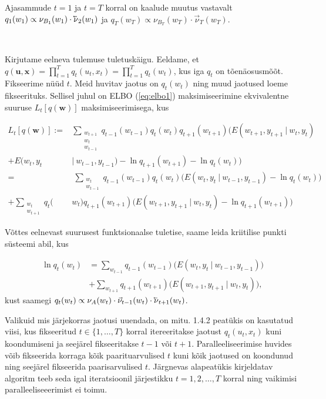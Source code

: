 Ajasammude $t=1$ ja $t=T$ korral on kaalude muutus vastavalt $q_1(w_1) \propto \nu_{B_1}(w_1) \cdot \cev{\nu}_{2}(w_1)$ ja $q_T(w_T) \propto \nu_{B_T}(w_T) \cdot \vec{\nu}_{T}(w_T)$.

\

Kirjutame eelneva tulemuse tuletuskäigu. Eeldame, et $q(\bm{u}, \bm{x}) = \prod_{t=1}^T{q_t(u_t, x_t)} = \prod_{t=1}^T{q_t(w_t)}$, kus iga $q_t$ on tõenäosusmõõt. Fikseerime nüüd $t$. Meid huvitav jaotus on $q_t(w_t)$ ning muud jaotused loeme fikseerituks. Sellisel juhul on ELBO (\ref{eq:elbo1}) maksimiseerimine ekvivalentne suuruse $L_t[q(\bm{w})]$ maksimiseerimisega, kus


\begin{align*}
    L_t[q(\bm{w})] :=& \sum_{\substack{w_{t+1}\\ w_{t} \\ w_{t-1}}} q_{t-1}(w_{t-1}) q_t(w_{t}) q_{t+1}(w_{t+1}) \Big(E(w_{t+1}, y_{t+1}\ |\ w_{t}, y_{t}) \\
    + E(w_{t}, y_{t}\ &|\ w_{t-1}, y_{t-1}) -  \ln q_{t+1}(w_{t+1}) -  \ln q_t(w_{t})  \Big)\\
    =&\ \sum_{\substack{w_t\\ w_{t-1}} } q_{t-1}(w_{t-1})q_t(w_{t}) \Big(E(w_{t}, y_{t}\ |\ w_{t-1}, y_{t-1}) -  \ln q_t(w_{t})  \Big)\\
    + \sum_{\substack{w_{t}\\ w_{t+1} }} q_t(&w_t)q_{t+1}(w_{t+1}) \Big(E(w_{t+1}, y_{t+1}\ |\ w_{t}, y_{t}) -  \ln q_{t+1}(w_{t+1})  \Big)
\end{align*}

Võttes eelnevast suurusest funktsionaalse tuletise, saame leida kriitilise punkti süsteemi abil, kus

\begin{align*}
   \ln q_t(w_{t}) &= \sum_{w_{t-1} } q_{t-1}(w_{t-1}) \Big(E(w_{t}, y_{t}\ |\ w_{t-1}, y_{t-1})  \Big) \\
&+ \sum_{w_{t+1} } q_{t+1}(w_{t+1}) \Big(E(w_{t+1}, y_{t+1}\ |\ w_{t}, y_{t})  \Big),
\end{align*}
kust saamegi $q_t(w_t) \propto \nu_A(w_t) \cdot \vec{\nu}_{t-1}(w_t) \cdot \cev{\nu}_{t+1}(w_t)$.

Valikuid mis järjekorras jaotusi uuendada, on mitu. \cite{Koudahl.2024}{ 1.4.2 peatükis} on kasutatud viisi, kus fikseeritud $t \in \{1, \ldots, T\}$ korral itereeritakse jaotust $q_t(u_t, x_t)$ kuni koondumiseni ja seejärel fikseeritakse $t-1$ või $t+1$. Paralleeliseerimise huvides võib fikseerida korraga kõik paarituarvulised $t$ kuni kõik jaotused on koondunud ning seejärel fikseerida paarisarvulised $t.$ Järgnevas alapeatükis kirjeldatav algoritm teeb seda igal iteratsioonil järjestikku $t = 1,2,\ldots,T$ korral ning vaikimisi paralleeliseeerimist ei toimu.

